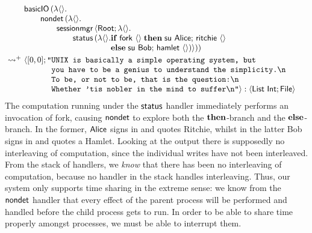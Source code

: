 \documentclass[12pt,phd,lfcs,twoside,openright,logo,leftchapter,normalheadings]{infthesis}
\theoremstyle{plain}
\theoremstyle{definition}
\begin{document}
\[
  \ba{@{~}l@{~}l}
    &\bl
    \basicIO\,(\lambda\Unit.\\
         \qquad\nondet\,(\lambda\Unit.\\
           \qquad\qquad\sessionmgr\,\Record{\Root;\lambda\Unit.\\
             \qquad\qquad\qquad\status\,(\lambda\Unit.
                 \ba[t]{@{}l}
                   \If\;\fork~\Unit\;\Then\;
                       \su~\Alice;\,
                       \quoteRitchie~\Unit\\
                   \Else\;
                       \su~\Bob;\,
                       \quoteHamlet~\Unit)}))
                 \ea
     \el \smallskip\\
     \reducesto^+&
     \Record{
       \ba[t]{@{}l}
         [0, 0];
         \texttt{"}\ba[t]{@{}l}
           \texttt{UNIX is basically a simple operating system, but }\\
           \texttt{you have to be a genius to understand the simplicity.\nl}\\
           \texttt{To be, or not to be, that is the question:\nl}\\
           \texttt{Whether 'tis nobler in the mind to suffer\nl"}} : \Record{\List~\Int; \UFile}
         \ea
       \ea
  \ea
\]
%
The computation running under the $\mathsf{status}$ handler immediately
performs an invocation of fork, causing $\mathsf{nondet}$ to explore both the
$\mathbf{then}$-branch and the $\mathbf{else}$-branch. In the former, $\mathsf{Alice}$ signs
in and quotes Ritchie, whilst in the latter Bob signs in and quotes a
Hamlet.
%
Looking at the output there is supposedly no interleaving of
computation, since the individual writes have not been
interleaved. From the stack of handlers, we \emph{know} that there has
been no interleaving of computation, because no handler in the stack
handles interleaving. Thus, our system only supports time sharing in
the extreme sense: we know from the $\mathsf{nondet}$ handler that every
effect of the parent process will be performed and handled before the
child process gets to run. In order to be able to share time properly
amongst processes, we must be able to interrupt them.
\end{document}
